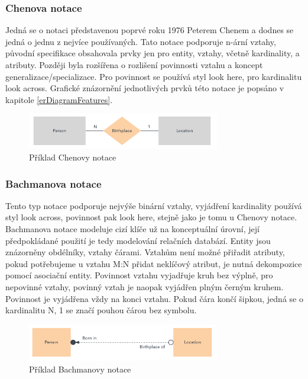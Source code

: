 \documentclass[czech,bachelor,public,dept460,male,oneside]{diploma}
\begin{document}
	\subsubsection{Chenova notace}
	Jedná se o notaci představenou poprvé roku 1976 Peterem Chenem a dodnes se jedná o jednu z nejvíce používaných. Tato notace podporuje n-ární vztahy, původní specifikace obsahovala prvky jen pro entity, vztahy, včetně kardinality, a atributy. Později byla rozšířena o rozlišení povinnosti vztahu a koncept generalizace/specializace. Pro povinnost se používá styl look here, pro kardinalitu look across. Grafické znázornění jednotlivých prvků této notace je popsáno v kapitole \ref{erDiagramFeatures}.
	
	\begin{figure}[!h]
		\centering
		\includegraphics[width=0.75\textwidth]{Figures/NotationExChen}
		\caption[Příklad Chenovy notace]{Příklad Chenovy notace \cite{whatIsERD}}
	\end{figure}
	
	\subsubsection{Bachmanova notace}
	Tento typ notace podporuje nejvýše binární vztahy, vyjádření kardinality používá styl look across, povinnost pak look here, stejně jako je tomu u Chenovy notace. Bachmanova notace modeluje cizí klíče už na konceptuální úrovní, její předpokládané použití je tedy modelování relačních databází. Entity jsou znázorněny obdélníky, vztahy čárami. Vztahům není možné přiřadit atributy, pokud potřebujeme u vztahu M:N přidat neklíčový atribut, je nutná dekompozice pomocí asociační entity. Povinnost vztahu vyjadřuje kruh bez výplně, pro nepovinné vztahy, povinný vztah je naopak vyjádřen plným černým kruhem. Povinnost je vyjádřena vždy na konci vztahu. Pokud čára končí šipkou, jedná se o kardinalitu N, 1 se značí pouhou čárou bez symbolu.
	
	\begin{figure}[!h]
		\centering
		\includegraphics[width=0.75\textwidth]{Figures/NotationExBachman}
		\caption[Příklad Bachmanovy notace]{Příklad Bachmanovy notace \cite{whatIsERD}}
	\end{figure}
	
\end{document}
